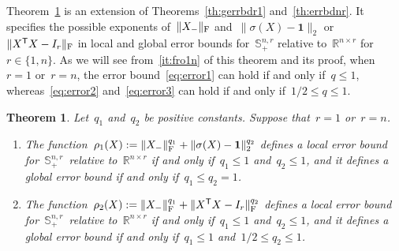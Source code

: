 \documentclass[11pt,a4paper]{article}  %
\newtheorem{theorem}{Theorem}%
\theoremstyle{definition}
\newcommand{\RR}{\mathbb{R}}
\newcommand{\res}{\rho}
\newcommand{\col}{r}
\newcommand{\stf}[1]{\mathbb{S}^{#1}}
\newcommand{\fro}{{\scriptstyle{\textnormal{F}}}}
\newcommand{\trs}{{\scriptstyle{\mathsf{T}}}}
\newcommand{\ones}{\mathbf{1}}
\begin{document}
Theorem~\ref{th:power1n} is an extension of Theorems~\ref{th:gerrbdr1} and~\ref{th:errbdnr}.
It specifies the possible exponents of~$\|X_{-}\|_\fro$ and~$\|\sigma(X) -\ones\|_2$
or~$\|X^\trs X -I_\col\|_\fro$ in local and global error bounds for~$\stf{n,\col}_+$ relative
to~$\RR^{n\times\col}$ for~$\col \in \{1, n\}$.
As we will see from~\ref{it:fro1n} of this theorem and its proof,
when~$\col = 1$ or~$\col = n$, the error bound~\eqref{eq:error1} can hold if and only if~$q \le 1$,
whereas~\eqref{eq:error2} and~\eqref{eq:error3} can hold if and only if~$1/2 \le q \le 1$.
\begin{theorem}
    \label{th:power1n}
    Let~$q_1$ and~$q_2$ be positive constants. Suppose that~$\col = 1$ or~$\col = n$.
\begin{enumerate}%
    \item\label{it:sigma1n} The function~$\res_1(X): = \|X_{-}\|_\fro^{q_1} +\|\sigma(X) -\ones\|_2^{q_2}$
          defines a local error bound for~$\stf{n,\col}_+$\!~relative
        to~$\RR^{n\times \col}$ if and only if~$q_1\le 1$ and~$q_2\le 1$, and it defines a
        global error bound if and only if~$q_1\le q_2 = 1$.
    \item\label{it:fro1n} The function~$\res_2(X): = \|X_{-}\|_\fro^{q_1} +\|X^\trs X -I_\col\|_\fro^{q_2}$
        defines a local error bound for~$\stf{n,\col}_+$\!~relative
        to~$\RR^{n\times \col}$ if and only if~$q_1\le 1$ and~$q_2\le 1$, and it defines a global error bound if and
        only if~$q_1 \le 1$ and~$1/2 \le q_2 \le 1$.
\end{enumerate}
\end{theorem}
\end{document}
